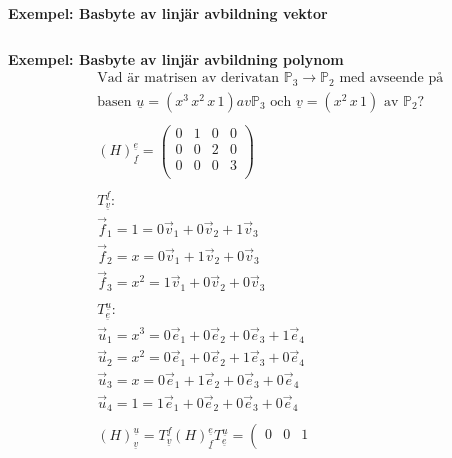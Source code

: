 \textbf{Exempel: Basbyte av linjär avbildning vektor}
\begin{align*} %
  &\quad  \text{} \\
\end{align*}

\textbf{Exempel: Basbyte av linjär avbildning polynom}
\begin{align*}
  &\quad  \text{Vad är matrisen av derivatan } \mathbb{P}_3\to\mathbb{P}_2
  \text{ med avseende på } \\
  &\quad  \text{basen } \underline{u} = (x^3 \, x^2 \, x \, 1) av \mathbb{P}_3 \text{ och }
  \underline{v} = (x^2 \, x \, 1)  \text{ av $\mathbb{P}_2$?}\\
  &\quad  \\
  &\quad  {(H)}^{\underline{e}}_{\underline{f}} =
  \left(\begin{array}{cccc}
    0 & 1 & 0 & 0 \\
    0 & 0 & 2 & 0 \\
    0 & 0 & 0 & 3 \\
  \end{array}\right)  \\
  &\quad  \\
  &\quad  T^{\underline{f}}_{\underline{v}}: \\
  &\quad  \vec{f}_1 = 1   = 0\vec{v}_1 + 0\vec{v}_2 + 1\vec{v}_3 \\
  &\quad  \vec{f}_2 = x   = 0\vec{v}_1 + 1\vec{v}_2 + 0\vec{v}_3 \\
  &\quad  \vec{f}_3 = x^2 = 1\vec{v}_1 + 0\vec{v}_2 + 0\vec{v}_3 \\
  &\quad  \\
  &\quad  T^{\underline{u}}_{\underline{e}}: \\
  &\quad  \vec{u}_1 = x^3 = 0\vec{e}_1 + 0\vec{e}_2 + 0\vec{e}_3 + 1\vec{e}_4 \\
  &\quad  \vec{u}_2 = x^2 = 0\vec{e}_1 + 0\vec{e}_2 + 1\vec{e}_3 + 0\vec{e}_4 \\
  &\quad  \vec{u}_3 = x   = 0\vec{e}_1 + 1\vec{e}_2 + 0\vec{e}_3 + 0\vec{e}_4 \\
  &\quad  \vec{u}_4 = 1   = 1\vec{e}_1 + 0\vec{e}_2 + 0\vec{e}_3 + 0\vec{e}_4 \\
  &\quad  \\
  &\quad  {(H)}^{\underline{u}}_{\underline{v}} =
  T^{\underline{f}}_{\underline{v}} {(H)}^{\underline{e}}_{\underline{f}} T^{\underline{u}}_{\underline{e}} =
  \left(\begin{array}{ccc}
    0 & 0 & 1  \\

\end{array}
\end{align*}
